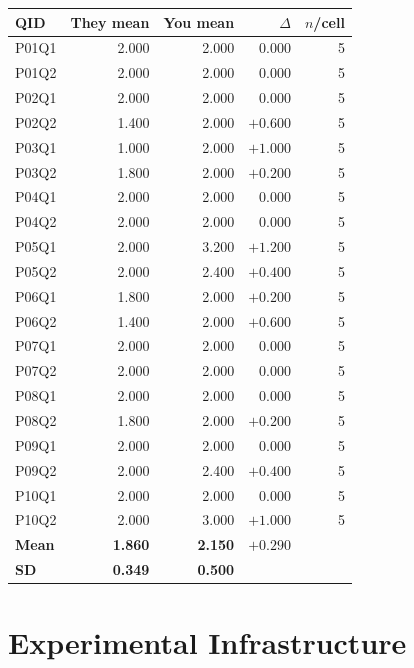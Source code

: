 \documentclass[12pt, letterpaper]{article}
\begin{document}
\begin{center}
\small
\begin{tabular}{lrrrr}
\toprule
\textbf{QID} & \textbf{They mean} & \textbf{You mean} & \textbf{$\Delta$} & \textbf{$n$/cell} \\
\midrule
P01Q1 & 2.000 & 2.000 & $0.000$  & 5 \\
P01Q2 & 2.000 & 2.000 & $0.000$  & 5 \\
P02Q1 & 2.000 & 2.000 & $0.000$  & 5 \\
P02Q2 & 1.400 & 2.000 & $+0.600$ & 5 \\
P03Q1 & 1.000 & 2.000 & $+1.000$ & 5 \\
P03Q2 & 1.800 & 2.000 & $+0.200$ & 5 \\
P04Q1 & 2.000 & 2.000 & $0.000$  & 5 \\
P04Q2 & 2.000 & 2.000 & $0.000$  & 5 \\
P05Q1 & 2.000 & 3.200 & $+1.200$ & 5 \\
P05Q2 & 2.000 & 2.400 & $+0.400$ & 5 \\
P06Q1 & 1.800 & 2.000 & $+0.200$ & 5 \\
P06Q2 & 1.400 & 2.000 & $+0.600$ & 5 \\
P07Q1 & 2.000 & 2.000 & $0.000$  & 5 \\
P07Q2 & 2.000 & 2.000 & $0.000$  & 5 \\
P08Q1 & 2.000 & 2.000 & $0.000$  & 5 \\
P08Q2 & 1.800 & 2.000 & $+0.200$ & 5 \\
P09Q1 & 2.000 & 2.000 & $0.000$  & 5 \\
P09Q2 & 2.000 & 2.400 & $+0.400$ & 5 \\
P10Q1 & 2.000 & 2.000 & $0.000$  & 5 \\
P10Q2 & 2.000 & 3.000 & $+1.000$ & 5 \\
\midrule
\textbf{Mean} & \textbf{1.860} & \textbf{2.150} & \textbf{$+0.290$} & \\
\textbf{SD}   & \textbf{0.349} & \textbf{0.500} & & \\
\bottomrule
\end{tabular}
\end{center}

\section{Experimental Infrastructure}
\label{app:code}
\end{document}
